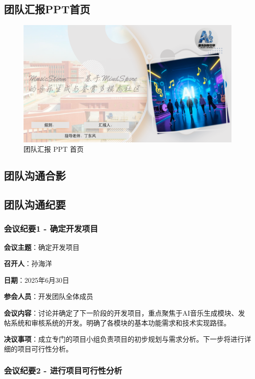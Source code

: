 \documentclass{base}
\numberwithin{figure}{section} %
\begin{document}
\subsection{团队汇报PPT首页}

\begin{figure}[H]
    \centering
    \includegraphics[width=\textwidth]{images/9-2.png}
    \caption{团队汇报 PPT 首页}
\end{figure}

\subsection{团队沟通合影}



\subsection{团队沟通纪要}

\subsubsection{会议纪要1 - 确定开发项目}


\textbf{会议主题}：确定开发项目

\textbf{召开人}：孙海洋

\textbf{日期}：2025年6月30日

\textbf{参会人员}：开发团队全体成员

\textbf{会议内容}：讨论并确定了下一阶段的开发项目，重点聚焦于AI音乐生成模块、发帖系统和审核系统的开发。明确了各模块的基本功能需求和技术实现路径。

\textbf{决议事项}：成立专门的项目小组负责项目的初步规划与需求分析。下一步将进行详细的项目可行性分析。

\subsubsection{会议纪要2 - 进行项目可行性分析}
\end{document}
